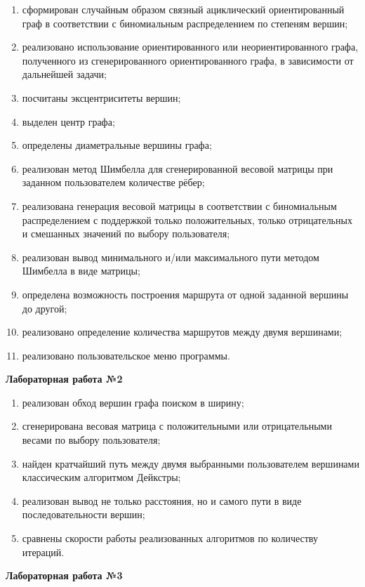 \documentclass[14pt,a4paper]{extarticle}
\begin{document}
\begin{enumerate}
    \item сформирован случайным образом связный ациклический ориентированный граф в соответствии с биномиальным распределением по степеням вершин;
    \item реализовано использование ориентированного или неориентированного графа, полученного из сгенерированного ориентированного графа, в зависимости от дальнейшей задачи;
    \item посчитаны эксцентриситеты вершин;
    \item выделен центр графа;
    \item определены диаметральные вершины графа;
    \item реализован метод Шимбелла для сгенерированной весовой матрицы при заданном пользователем количестве рёбер;
    \item реализована генерация весовой матрицы в соответствии с биномиальным распределением с поддержкой только положительных, только отрицательных и смешанных значений по выбору пользователя;
    \item реализован вывод минимального и/или максимального пути методом Шимбелла в виде матрицы;
    \item определена возможность построения маршрута от одной заданной вершины до другой;
    \item реализовано определение количества маршрутов между двумя вершинами;
    \item реализовано пользовательское меню программы.
\end{enumerate}

\textbf{Лабораторная работа №2}

\begin{enumerate}[start=12]
    \item реализован обход вершин графа поиском в ширину;
    \item сгенерирована весовая матрица с положительными или отрицательными весами по выбору пользователя;
    \item найден кратчайший путь между двумя выбранными пользователем вершинами классическим алгоритмом Дейкстры;
    \item реализован вывод не только расстояния, но и самого пути в виде последовательности вершин;
    \item сравнены скорости работы реализованных алгоритмов по количеству итераций.
\end{enumerate}

\textbf{Лабораторная работа №3}
\end{document}

